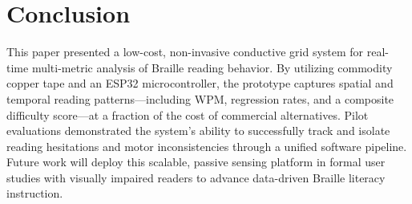 \documentclass[conference]{IEEEtran}
\begin{document}
    \vspace{-4mm}
    \section{Conclusion}
    \label{sec:conclusion}

    This paper presented a low-cost, non-invasive conductive grid system for real-time multi-metric analysis of Braille reading behavior. By utilizing commodity copper tape and an ESP32 microcontroller, the prototype captures spatial and temporal reading patterns---including WPM, regression rates, and a composite difficulty score---at a fraction of the cost of commercial alternatives. Pilot evaluations demonstrated the system's ability to successfully track and isolate reading hesitations and motor inconsistencies through a unified software pipeline. Future work will deploy this scalable, passive sensing platform in formal user studies with visually impaired readers to advance data-driven Braille literacy instruction.

    \balance
    
    

    
\end{document}
